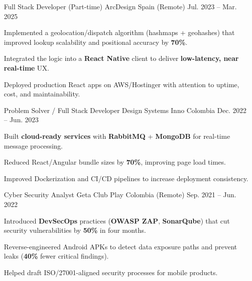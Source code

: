 \begin{cventries}
  \cventry
  {Full Stack Developer (Part-time)}
  {ArcDesign}
  {Spain (Remote)}
  {Jul. 2023 -- Mar. 2025}
  {
    \begin{cvitems}
      \item {Implemented a geolocation/dispatch algorithm (hashmaps + geohashes) that improved lookup scalability and positional accuracy by \textbf{70\%}.}
      \item {Integrated the logic into a \textbf{React Native} client to deliver \textbf{low-latency, near real-time} UX.}
      \item {Deployed production React apps on AWS/Hostinger with attention to uptime, cost, and maintainability.}
    \end{cvitems}
  }

  \cventry
  {Problem Solver / Full Stack Developer}
  {Design Systems Inno}
  {Colombia}
  {Dec. 2022 -- Jun. 2023}
  {
    \begin{cvitems}
      \item {Built \textbf{cloud-ready services} with \textbf{RabbitMQ} + \textbf{MongoDB} for real-time message processing.}
      \item {Reduced React/Angular bundle sizes by \textbf{70\%}, improving page load times.}
      \item {Improved Dockerization and CI/CD pipelines to increase deployment consistency.}
    \end{cvitems}
  }

  \cventry
  {Cyber Security Analyst}
  {Geta Club Play}
  {Colombia (Remote)}
  {Sep. 2021 -- Jun. 2022}
  {
    \begin{cvitems}
      \item {Introduced \textbf{DevSecOps} practices (\textbf{OWASP ZAP}, \textbf{SonarQube}) that cut security vulnerabilities by \textbf{50\%} in four months.}
      \item {Reverse-engineered Android APKs to detect data exposure paths and prevent leaks (\textbf{40\%} fewer critical findings).}
      \item {Helped draft ISO/27001-aligned security processes for mobile products.}
    \end{cvitems}
  }

\end{cventries}

